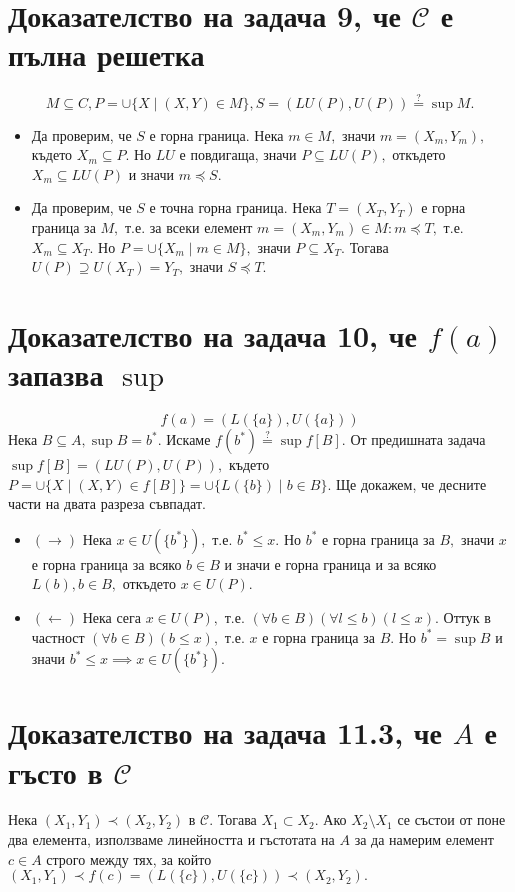 \documentclass{article}
\newcommand{\eqq}{\stackrel{?}{=}}
\begin{document}
\section{Доказателство на задача 9, че $\mathcal{C}$ е пълна решетка}
\[M \subseteq C, P = \cup \{X \mid (X, Y) \in M\}, S = (LU(P), U(P)) \eqq \sup{M}.\]
\begin{itemize}
    \item Да проверим, че $S$ е горна граница. Нека $m \in M,$ значи $m = (X_m, Y_m),$ където $X_m \subseteq P.$ Но $LU$ е повдигаща, значи $P \subseteq LU(P),$ откъдето $X_m \subseteq LU(P)$ и значи $m \preceq S.$
    \item Да проверим, че $S$ е точна горна граница. Нека $T = (X_T, Y_T)$ е горна граница за $M,$ т.е. за всеки елемент $m = (X_m, Y_m) \in M: m \preceq T,$ т.е. $X_m \subseteq X_T.$ Но $P = \cup \{X_m \mid m \in M\},$ значи $P \subseteq X_T.$ Тогава $U(P) \supseteq U(X_T) = Y_T,$ значи $S \preceq T.$
\end{itemize}

\section{Доказателство на задача 10, че $f(a)$ запазва $\sup$}
\[f(a) = (L(\{a\}), U(\{a\}))\]
Нека $B \subseteq A, \sup B = b^*.$ Искаме $f(b^*) \eqq \sup f[B].$
От предишната задача $\sup f[B] = (LU(P), U(P)),$ където $P = \cup \{X \mid (X, Y) \in f[B]\} = \cup \{L(\{b\}) \mid b \in B\}.$ Ще докажем, че десните части на двата разреза съвпадат.
\begin{itemize}
    \item $(\to)$ Нека $x \in U(\{b^*\}),$ т.е. $b^* \leq x.$ Но $b^*$ е горна граница за $B,$ значи $x$ е горна граница за всяко $b \in B$ и значи е горна граница и за всяко $L(b), b\in B,$ откъдето $x \in U(P).$
    \item $(\leftarrow)$ Нека сега $x \in U(P),$ т.е. $(\forall b \in B)(\forall l \leq b)(l \leq x).$ Оттук в частност $(\forall b\in B)(b \leq x),$ т.е. $x$ е горна граница за $B.$ Но $b^* = \sup B$ и значи $b^* \leq x \implies x \in U(\{b^*\}).$
\end{itemize}

\section{Доказателство на задача 11.3, че $A$ е гъсто в $\mathcal{C}$}
Нека $(X_1, Y_1) \prec (X_2, Y_2)$ в $\mathcal{C}.$ Тогава $X_1 \subset X_2.$ Ако $X_2 \setminus X_1$ се състои от поне два елемента, използваме линейността и гъстотата на $A$ за да намерим елемент $c \in A$ строго между тях, за който $(X_1, Y_1) \prec f(c) = (L(\{c\}), U(\{c\})) \prec (X_2, Y_2).$
\end{document}

